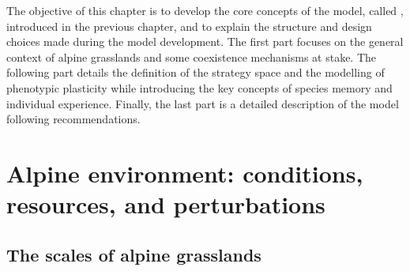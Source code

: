 %


\begin{fullwidth}
The objective of this chapter is to develop the core concepts of the model, called \model , introduced in the previous chapter, and to explain the structure and design choices made during the model development. The first part focuses on the general context of alpine grasslands and some coexistence mechanisms at stake. The following part details the definition of the strategy space and the modelling of phenotypic plasticity while introducing the key concepts of species memory and individual experience. Finally, the last part is a detailed description of the model following \parencite{grimm_standard_2006} recommendations.
\end{fullwidth}

\chapter{Alpine environment: conditions, resources, and perturbations}
\section{The scales of alpine grasslands}

